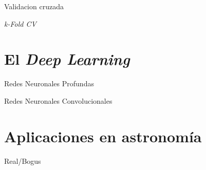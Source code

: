 \documentclass[11pt]{beamer}
\begin{document}
\begin{frame}{Validacion cruzada}
    
\end{frame}
\begin{frame}{\textit{k-Fold CV}}
    
\end{frame}
\section{El \textit{Deep Learning}}
\begin{frame}{Redes Neuronales Profundas}
    
\end{frame}
\begin{frame}{Redes Neuronales Convolucionales}
    
\end{frame}
\section{Aplicaciones en astronom\'ia}
\begin{frame}{Real/Bogus}
    
\end{frame}

\end{document}
